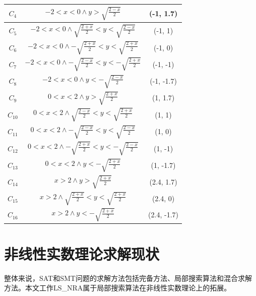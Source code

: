 \begin{example}
\begin{enumerate}
\begin{table}
{\begin{tabular}{c | c | c}
            $C_4$ & $-2 < x < 0 \wedge y > \sqrt{\frac{2 - x}{2}}$ & (-1, 1.7) \\\hline
            $C_5$ & $-2 < x < 0 \wedge \sqrt{\frac{2 + x}{2}} < y < \sqrt{\frac{2 - x}{2}}$ & (-1, 1)\\\hline
            $C_6$ & $-2 < x < 0 \wedge -\sqrt{\frac{2 + x}{2}} < y < \sqrt{\frac{2 + x}{2}}$ & (-1, 0) \\\hline
            $C_7$ & $-2 < x < 0 \wedge -\sqrt{\frac{2 - x}{2}}< y < -\sqrt{\frac{2 + x}{2}}$ & (-1, -1) \\\hline
            $C_8$ & $-2 < x < 0 \wedge y < -\sqrt{\frac{2 - x}{2}}$ & (-1, -1.7) \\\hline

            $C_9$ & $0 < x < 2 \wedge y > \sqrt{\frac{2 + x}{2}}$ & (1, 1.7) \\\hline
            $C_{10}$ & $0 < x < 2 \wedge \sqrt{\frac{2 - x}{2}} < y < \sqrt{\frac{2 + x}{2}}$ & (1, 1) \\\hline
            $C_{11}$ & $0 < x < 2 \wedge -\sqrt{\frac{2 - x}{2}} < y < \sqrt{\frac{2 - x}{2}}$ & (1, 0) \\\hline
            $C_{12}$ & $0 < x < 2 \wedge -\sqrt{\frac{2 + x}{2}} < y < -\sqrt{\frac{2 - x}{2}}$ & (1, -1) \\\hline
            $C_{13}$ & $0 < x < 2 \wedge y < -\sqrt{\frac{2 + x}{2}}$ & (1, -1.7) \\\hline

            $C_{14}$ & $x > 2 \wedge y > \sqrt{\frac{2 + x}{2}}$ & (2.4, 1.7) \\\hline
            $C_{15}$ & $x > 2 \wedge \sqrt{\frac{2 + x}{2}} < y < \sqrt{\frac{2 + x}{2}}$ & (2.4, 0) \\\hline
            $C_{16}$ & $x > 2 \wedge y < -\sqrt{\frac{2 + x}{2}}$ & (2.4, -1.7) \\\hline
            \end{tabular}
        }
        \label{tab:cad}
    \end{table}
\end{enumerate}
\label{ex:cad}    
\end{example}


\section{非线性实数理论求解现状}
整体来说，SAT和SMT问题的求解方法包括完备方法、局部搜索算法和混合求解方法。本文工作LS\_NRA属于局部搜索算法在非线性实数理论上的拓展。

